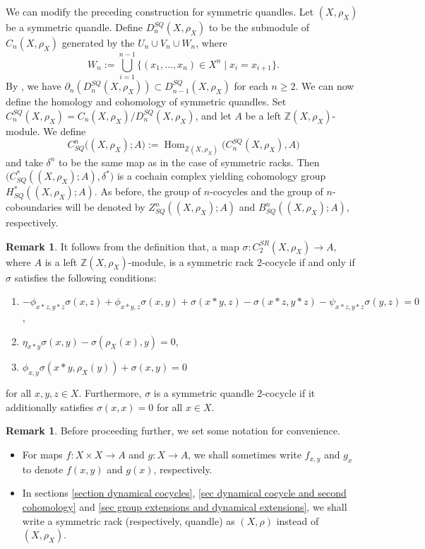 \documentclass[11pt,reqno]{amsart}
\theoremstyle{definition}
\newtheorem{remark}[theorem]{Remark}
\numberwithin{equation}{subsection}
\newcommand{\Hom}{\operatorname{Hom}}
\begin{document}
We can modify the preceding construction for symmetric quandles. Let $(X,\rho_X)$ be a symmetric quandle.  Define $D_n^{SQ}(X, \rho_X)$ to be the submodule of $C_n(X,\rho_X)$ generated by the $U_n \cup V_n \cup W_n$, where 
	$$W_n:=\bigcup_{i=1}^{n-1} \Big\{(x_1, \ldots, x_n)\in X^n \mid x_i=x_{i+1} \Big\}.$$
By \cite[Proposition 6.8]{KSS2024}, we have $\partial_n(D^{SQ}_{n}(X,\rho_X)) \subset D^{SQ}_{n-1}(X,\rho_X)$ for each $n \ge 2$. We can now define the homology and cohomology of symmetric quandles. Set $C_n^{SQ}(X,\rho_X)= C_n(X,\rho_X)/ D_n^{SQ}(X,\rho_X)$, and let $A$ be a left $\mathbb{Z}(X,\rho_X)$-module. We define $$C^n_{SQ} \big((X,\rho_X);A \big):=\Hom_{\mathbb{Z}(X,\rho_X)}\big(C_n^{SQ}(X,\rho_X),A \big)$$ and take $\delta^n$ to be the same map as in the case of symmetric racks. Then $\big(C^*_{SQ}((X,\rho_X);A),\delta^*\big)$ is a cochain complex yielding cohomology group $H^*_{SQ}((X,\rho_X);A)$. As before, the group of $n$-cocycles and the group of $n$-coboundaries will be denoted by $Z_{SQ}^{n}((X, \rho_{X});A)$ and $B_{SQ}^{n}((X, \rho_{X});A)$, respectively.

	\begin{remark} \label{cocycleconditions}
It follows from the  definition that, a map $\sigma: C_2^{SR}(X,\rho_X) \rightarrow A$, where $A$ is a left $\mathbb{Z}(X,\rho_X)$-module, is a symmetric rack 2-cocycle if and only if $\sigma$ satisfies the following conditions:
\begin{enumerate}
\item \label{cocyclecondition1}  $-\phi_{x *z,y *z}\sigma(x,z)+\phi_{x* y,z}\sigma(x,y)+\sigma(x*y, z)-\sigma(x *z, y*z)-\psi_{x* z,y* z}\sigma(y,z)=0$,
\item \label{cocyclecondition2.1} $\eta_{x *y}\sigma(x,y)-\sigma(\rho_X(x),y)=0$,
\item \label{cocyclecondition2.2} $\phi_{x,y}\sigma(x*y,\rho_X(y))+\sigma(x,y)=0$
\end{enumerate}
for all $x,y,z \in X$.
Furthermore,  $\sigma$ is a symmetric quandle 2-cocycle if it additionally satisfies $\sigma(x,x)=0$ for all $x \in X$.
\end{remark}

\begin{remark}
Before proceeding further, we set some notation for convenience.
\begin{itemize}
\item For maps $f:X \times X \to A$ and $g:X \to A$, we shall sometimes write $f_{x, y}$ and $g_x$ to denote $f(x, y)$ and $g(x)$, respectively.
\item In sections \ref{section dynamical cocycles}, \ref{sec dynamical cocycle and second cohomology} and \ref{sec group extensions and dynamical extensions}, we shall write a symmetric rack (respectively, quandle) as $(X, \rho)$ instead of $(X, \rho_X)$.
\end{itemize}
\end{remark}
\medskip	
\end{document}
